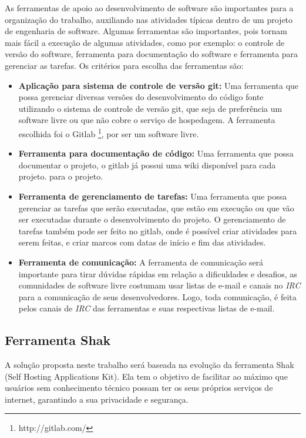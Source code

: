 As ferramentas de apoio ao desenvolvimento de software são importantes para a
organização do trabalho, auxiliando nas atividades típicas dentro de um projeto
de engenharia de software. Algumas ferramentas são importantes, pois tornam mais fácil
a execução de algumas atividades, como por exemplo: o controle de versão do software,
ferramenta para documentação do software e ferramenta para gerenciar as tarefas.
Os critérios para escolha das ferramentas são:

\begin{itemize}
  \item \textbf{Aplicação para sistema de controle de versão git:} Uma ferramenta que
  possa gerenciar diversas versões do desenvolvimento do código fonte utilizando
  o sistema de controle de versão git, que seja de preferência um software livre
  ou que não cobre o serviço de hospedagem. A ferramenta escolhida foi o Gitlab \footnote{http://gitlab.com/}, por ser um software livre.
  \item \textbf{Ferramenta para documentação de código:} Uma ferramenta que possa
  documentar o projeto, o gitlab já possui uma wiki disponível para cada projeto.
  para o projeto.
  \item \textbf{Ferramenta de gerenciamento de tarefas:} Uma ferramenta que possa
  gerenciar as tarefas que serão executadas, que estão em execução ou que vão ser executadas
  durante o desenvolvimento do projeto. O gerenciamento de tarefas também pode ser
  feito no gitlab, onde é possível criar atividades para serem feitas, e criar marcos
  com datas de início e fim das atividades.
  \item \textbf{Ferramenta de comunicação:} A ferramenta de comunicação será
  importante para tirar dúvidas rápidas em relação a dificuldades e desafios, as
  comunidades de software livre costumam usar listas de e-mail e canais no \textit{IRC}
  para a comunicação de seus desenvolvedores. Logo, toda comunicação, é feita
  pelos canais de \textit{IRC} das ferramentas e suas respectivas listas de e-mail.
\end{itemize}

\subsection{Ferramenta Shak}

A solução proposta neste trabalho será baseada na evolução da ferramenta Shak
(Self Hosting Applications Kit). Ela tem o objetivo de facilitar 
ao máximo que usuários sem conhecimento técnico possam ter os seus próprios 
serviços de internet, garantindo a sua privacidade e segurança. 

